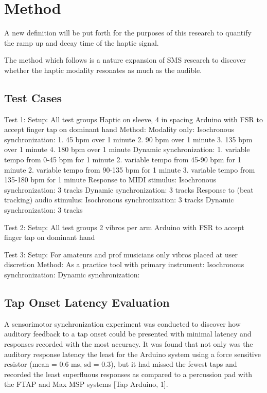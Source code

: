 \chapter{Method}
A new definition will be put forth for the purposes of this research to quantify the ramp up and decay time of the haptic signal. 

The method which follows is a nature expansion of SMS research to discover whether the haptic modality resonates as much as the audible.

\section{Test Cases}
Test 1:
    Setup:
        All test groups
        Haptic on sleeve, 4 in spacing
        Arduino with FSR to accept finger tap on dominant hand
    Method:
        Modality only:
            Isochronous synchronization:
                1. 45 bpm over 1 minute
                2. 90 bpm over 1 minute
                3. 135 bpm over 1 minute
                4. 180 bpm over 1 minute
            Dynamic synchronization:
                1. variable tempo from 0-45 bpm for 1 minute
                2. variable tempo from 45-90 bpm for 1 minute
                2. variable tempo from 90-135 bpm for 1 minute
                3. variable tempo from 135-180 bpm for 1 minute
        Response to MIDI stimulus:
            Isochronous synchronization:
                3 tracks
            Dynamic synchronization:
                3 tracks
        Response to (beat tracking) audio stimulus:
            Isochronous synchronization:
                3 tracks
            Dynamic synchronization:
                3 tracks

Test 2:
    Setup:
        All test groups    
        2 vibros per arm
        Arduino with FSR to accept finger tap on dominant hand

Test 3:
    Setup:
        For amateurs and prof musicians only
        vibros placed at user discretion   
    Method:
        As a practice tool with primary instrument:
            Isochronous synchronization:
            Dynamic synchronization: 


\section{Tap Onset Latency Evaluation}

A sensorimotor synchronization experiment was conducted to discover how auditory feedback to a tap onset could be presented with minimal latency and responses recorded with the most accuracy. It was found that not only was the auditory response latency the least for the Arduino system using a force sensitive resistor (mean = 0.6 ms, sd = 0.3), but it had missed the fewest taps and recorded the least superfluous responses as compared to a percussion pad with the FTAP and Max MSP systems [Tap Arduino, 1].


